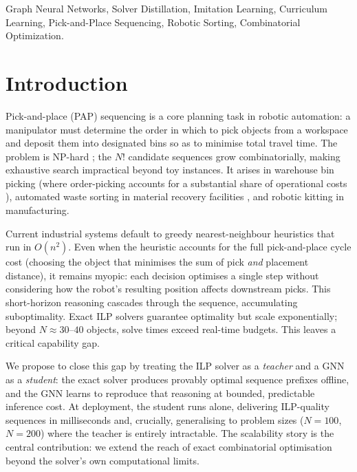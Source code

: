 \documentclass[conference]{IEEEtran}
\begin{document}
\begin{IEEEkeywords}
Graph Neural Networks, Solver Distillation, Imitation Learning, Curriculum Learning, Pick-and-Place Sequencing, Robotic Sorting, Combinatorial Optimization.
\end{IEEEkeywords}

\section{Introduction}

Pick-and-place (PAP) sequencing is a core planning task in robotic automation: a manipulator must determine the order in which to pick objects from a workspace and deposit them into designated bins so as to minimise total travel time. The problem is NP-hard \cite{chalasani1996}; the $N!$ candidate sequences grow combinatorially, making exhaustive search impractical beyond toy instances. It arises in warehouse bin picking (where order-picking accounts for a substantial share of operational costs \cite{cheng2024drl}), automated waste sorting in material recovery facilities \cite{gundupalli2021sequence, kiyokawa2024challenges}, and robotic kitting in manufacturing.

Current industrial systems default to greedy nearest-neighbour heuristics that run in $O(n^2)$. Even when the heuristic accounts for the full pick-and-place cycle cost (choosing the object that minimises the sum of pick \emph{and} placement distance), it remains myopic: each decision optimises a single step without considering how the robot's resulting position affects downstream picks. This short-horizon reasoning cascades through the sequence, accumulating suboptimality. Exact ILP solvers guarantee optimality but scale exponentially; beyond $N \approx 30$--$40$ objects, solve times exceed real-time budgets. This leaves a critical capability gap.

We propose to close this gap by treating the ILP solver as a \emph{teacher} and a GNN as a \emph{student}: the exact solver produces provably optimal sequence prefixes offline, and the GNN learns to reproduce that reasoning at bounded, predictable inference cost. At deployment, the student runs alone, delivering ILP-quality sequences in milliseconds and, crucially, generalising to problem sizes ($N{=}100$, $N{=}200$) where the teacher is entirely intractable. The scalability story is the central contribution: we extend the reach of exact combinatorial optimisation beyond the solver's own computational limits.
\end{document}
